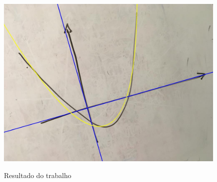 \documentclass{article}
\begin{document}
\begin{figure}[h!]
    \subfigure
        {\includegraphics[scale=0.2]{exemplo3ParaboleImage.jpg}}
    \caption{Resultado do trabalho }
\end{figure}
    
    
\end{document}
